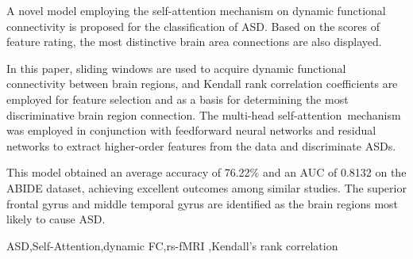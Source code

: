 \documentclass[a4paper]{cas-dc}
\begin{document}

\begin{highlights}
\item A novel model employing the self-attention mechanism on dynamic functional connectivity is proposed for the classification of ASD. Based on the scores of feature rating, the most distinctive brain area connections are also displayed.

\item In this paper, sliding windows are used to acquire dynamic functional connectivity between brain regions, and Kendall rank correlation coefficients are employed for feature selection and as a basis for determining the most discriminative brain region connection. The multi-head self-attention mechanism was employed in conjunction with feedforward neural networks and residual networks to extract higher-order features from the data and discriminate ASDs.

\item This model obtained an average accuracy of 76.22\% and an AUC of 0.8132 on the ABIDE dataset, achieving excellent outcomes among similar studies. The superior frontal gyrus and middle temporal gyrus are identified as the brain regions most likely to cause ASD. 
\end{highlights}

\begin{keywords}
 ASD\sep Self-Attention\sep dynamic FC\sep rs-fMRI \sep Kendall's rank correlation
\end{keywords}

\maketitle

\end{document}

